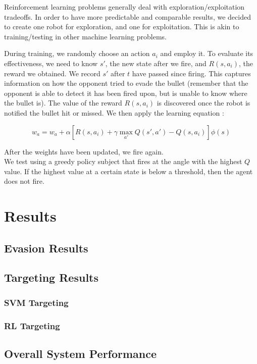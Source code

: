 \documentclass{article}
\theoremstyle{plain}
\theoremstyle{definition}
\theoremstyle{remark}
\begin{document}
Reinforcement learning problems generally deal with exploration/exploitation tradeoffs. In order to have more predictable and comparable results, we decided to
create one robot for exploration, and one for exploitation. This is akin to training/testing in other machine learning problems.

During training, we randomly choose an action $a_i$ and employ it. To evaluate its effectiveness, we need to know $s'$, the new state after we fire,
and $R(s, a_i)$, the reward we obtained. We record $s'$ after $t$ have passed since firing. This captures information on
how the opponent tried to evade the bullet (remember that the opponent is able to detect it has been fired upon, but is unable to know where the bullet is).
The value of the reward $R(s, a_i)$ is discovered once the robot is notified the bullet hit or missed. We then apply the learning equation \cite{russelnorvig}:

$$w_a = w_a + \alpha\left[R(s, a_i) + \gamma\max_{a'}Q(s', a') - Q(s, a_i)\right]\phi(s)$$

After the weights have been updated, we fire again.\\

We test using a greedy policy subject that fires at the angle with the highest $Q$ value. If the highest value at a certain state is below a threshold, then
the agent does not fire.

\section{Results}
\subsection*{Evasion Results}

\subsection*{Targeting Results}

\subsubsection*{SVM Targeting}

\subsubsection*{RL Targeting}

\subsection*{Overall System Performance}
\end{document}
